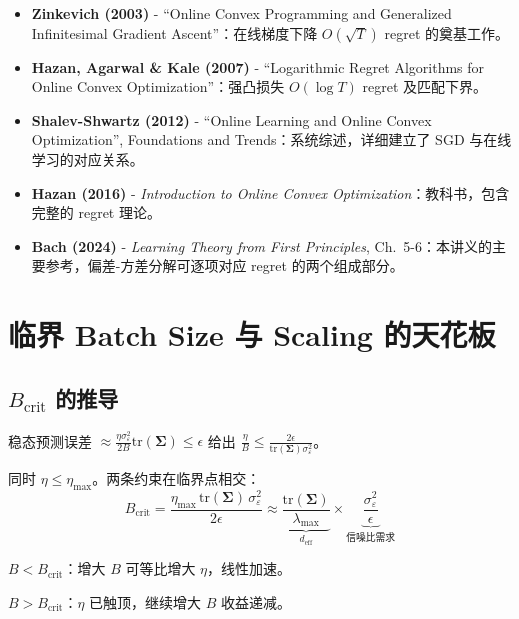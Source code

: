 \documentclass[12pt, a4paper]{ctexart}
\begin{document}
\begin{itemize}
    \item \textbf{Zinkevich (2003)} - ``Online Convex Programming and Generalized Infinitesimal Gradient Ascent''：在线梯度下降 $O(\sqrt{T})$ regret 的奠基工作。
    \item \textbf{Hazan, Agarwal \& Kale (2007)} - ``Logarithmic Regret Algorithms for Online Convex Optimization''：强凸损失 $O(\log T)$ regret 及匹配下界。
    \item \textbf{Shalev-Shwartz (2012)} - ``Online Learning and Online Convex Optimization'', Foundations and Trends：系统综述，详细建立了 SGD 与在线学习的对应关系。
    \item \textbf{Hazan (2016)} - \textit{Introduction to Online Convex Optimization}：教科书，包含完整的 regret 理论。
    \item \textbf{Bach (2024)} - \textit{Learning Theory from First Principles}, Ch.\ 5-6：本讲义的主要参考，偏差-方差分解可逐项对应 regret 的两个组成部分。
\end{itemize}


\section{临界 Batch Size 与 Scaling 的天花板}

\subsection{$B_{\text{crit}}$ 的推导}

稳态预测误差 $\approx \frac{\eta\sigma_\varepsilon^2}{2B}\text{tr}(\boldsymbol{\Sigma}) \leq \epsilon$ 给出 $\frac{\eta}{B} \leq \frac{2\epsilon}{\text{tr}(\boldsymbol{\Sigma})\sigma_\varepsilon^2}$。

同时 $\eta \leq \eta_{\max}$。两条约束在临界点相交：
\begin{equation}
    \boxed{B_{\text{crit}} = \frac{\eta_{\max}\,\text{tr}(\boldsymbol{\Sigma})\,\sigma_\varepsilon^2}{2\epsilon} \approx \underbrace{\frac{\text{tr}(\boldsymbol{\Sigma})}{\lambda_{\max}}}_{d_{\text{eff}}} \times \underbrace{\frac{\sigma_\varepsilon^2}{\epsilon}}_{\text{信噪比需求}}}
\end{equation}

$B < B_{\text{crit}}$：增大 $B$ 可等比增大 $\eta$，线性加速。

$B > B_{\text{crit}}$：$\eta$ 已触顶，继续增大 $B$ 收益递减。
\end{document}
